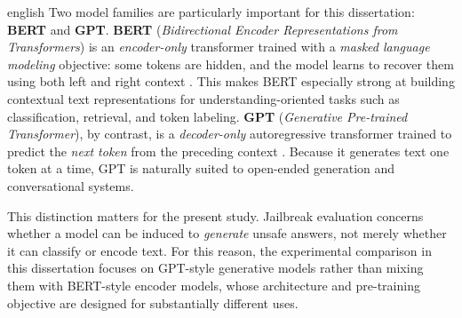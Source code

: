 \begin{otherlanguage*}{english}
Two model families are particularly important for this dissertation: \textbf{BERT} and \textbf{GPT}. \textbf{BERT} (\emph{Bidirectional Encoder Representations from Transformers}) is an \emph{encoder-only} transformer trained with a \emph{masked language modeling} objective: some tokens are hidden, and the model learns to recover them using both left and right context \cite{devlinBERTPretrainingDeep2019}. This makes BERT especially strong at building contextual text representations for understanding-oriented tasks such as classification, retrieval, and token labeling. \textbf{GPT} (\emph{Generative Pre-trained Transformer}), by contrast, is a \emph{decoder-only} autoregressive transformer trained to predict the \emph{next token} from the preceding context \cite{radfordLanguageModelsAre}. Because it generates text one token at a time, GPT is naturally suited to open-ended generation and conversational systems.

This distinction matters for the present study. Jailbreak evaluation concerns whether a model can be induced to \emph{generate} unsafe answers, not merely whether it can classify or encode text. For this reason, the experimental comparison in this dissertation focuses on GPT-style generative models rather than mixing them with BERT-style encoder models, whose architecture and pre-training objective are designed for substantially different uses.


\end{otherlanguage*}
